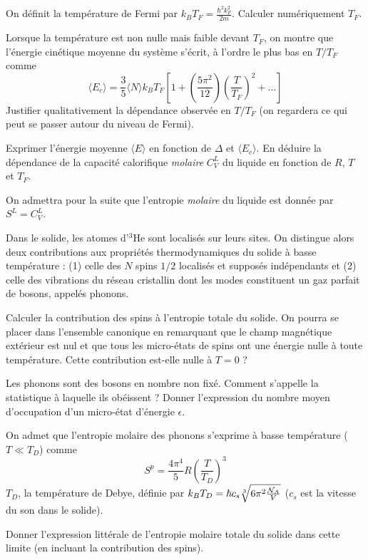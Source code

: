 \question
On définit la température de Fermi par $k_BT_F =\frac{\hbar^2 k_F^2}{2m}$. Calculer numériquement $T_F$.
 
\question
Lorsque la température est non nulle mais faible devant  $T_F$, on montre que l'énergie cinétique moyenne du système s'écrit, à l'ordre le plus bas en $T/T_F$ comme
$$
\langle E_c \rangle=\frac{3}{5}\langle N \rangle k_B T_F \left[1+\left(\frac{5\pi^2}{12}\right) \left(\frac{T}{T_F}\right)^2+\ldots\right]
$$
Justifier qualitativement la dépendance observée en $T/T_F$ (on regardera ce qui peut se passer autour du niveau de Fermi).

\question
Exprimer l'énergie moyenne $\langle E \rangle$ en fonction de $\Delta$ et $\langle E_c \rangle$. En déduire la dépendance
de la capacité calorifique \textit{molaire} $C_V^L$ du liquide en fonction de $R$, $T$ et $T_F$.

On admettra pour la suite  que l'entropie \textit{molaire} du liquide est donnée par $S^L =C_V^L$.


Dans le solide, les atomes d'$^3$He sont localisés sur leurs sites. On distingue alors deux
contributions aux propriétés thermodynamiques du solide à basse température : (1) celle
des $N$ spins $1/2$ localisés et supposés indépendants et (2) celle des vibrations du réseau
cristallin dont les modes constituent un gaz parfait de bosons, appelés \og phonons\fg.

\question
Calculer la contribution des spins à l'entropie totale du solide. On pourra se placer dans l'ensemble canonique en remarquant que le champ magnétique extérieur est nul et que tous les micro-états de spins ont une énergie nulle à toute température. Cette contribution est-elle nulle à $T = 0$ ?

\question
Les phonons sont des bosons en nombre non fixé. Comment s'appelle la statistique à laquelle ils obéissent ? Donner l'expression du nombre moyen d'occupation d'un micro-état d'énergie $\epsilon$.

On admet que l'entropie molaire des phonons s'exprime à basse température ($T \ll T_D$) comme
$$
S^p=\frac{4\pi^4}{5} R \left(\frac{T}{T_D}\right)^3
$$
$T_D$, la température de Debye, définie par $k_B T_D=\hbar c_s \sqrt[3]{6\pi^2 \frac{{\cal N}_A }{V}}$ ($c_s$ est la vitesse du son dans le solide).

\question
Donner l'expression littérale de l'entropie molaire totale du solide dans cette limite (en incluant la
contribution des spins).

